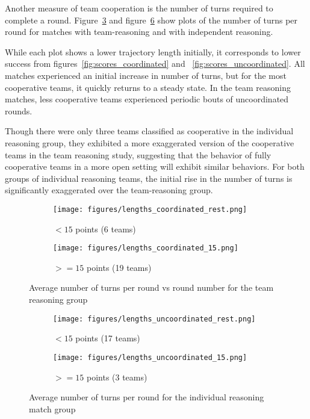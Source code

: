 {Another measure of team cooperation is the number of turns required to complete a round. Figure~\ref{fig:lengths_coordinated} and figure~\ref{fig:lengths_uncoordinated} show plots of the number of turns per round for matches with team-reasoning and with independent reasoning.

While each plot shows a lower trajectory length initially, it corresponds to lower success from figures~\ref{fig:scores_coordinated} and ~\ref{fig:scores_uncoordinated}. All matches experienced an initial increase in number of turns, but for the most cooperative teams, it quickly returns to a steady state. In the team reasoning matches, less cooperative teams experienced periodic bouts of uncoordinated rounds.

Though there were only three teams classified as cooperative in the individual reasoning group, they exhibited a more exaggerated version of the cooperative teams in the team reasoning study, suggesting that the behavior of fully cooperative teams in a more open setting will exhibit similar behaviors. For both groups of individual reasoning teams, the initial rise in the number of turns is significantly exaggerated over the team-reasoning group. 


\begin{figure}
\centering
\begin{subfigure}{.5\textwidth}
\centering
\texttt{[image: figures/lengths\_coordinated\_rest.png]}
\caption{$< 15$ points (6 teams)}
\label{fig:lengths_coordinated_rest}
\end{subfigure}%
\begin{subfigure}{.5\textwidth}
\centering
\texttt{[image: figures/lengths\_coordinated\_15.png]}
\caption{$>= 15$ points (19 teams)}
\label{fig:lengths_coordinated_15}
\end{subfigure}
\caption{Average number of turns per round vs round number for the team reasoning group}
\label{fig:lengths_coordinated}
\end{figure}

\begin{figure}
\centering
\begin{subfigure}{.5\textwidth}
\centering
\texttt{[image: figures/lengths\_uncoordinated\_rest.png]}
\caption{$< 15$ points (17 teams)}
\label{fig:lengths_uncoordinated_rest}
\end{subfigure}%
\begin{subfigure}{.5\textwidth}
\centering
\texttt{[image: figures/lengths\_uncoordinated\_15.png]}
\caption{$>= 15$ points (3 teams)}
\label{fig:lengths_uncoordinated_15}
\end{subfigure}
\caption{Average number of turns per round for the individual reasoning match group}
\label{fig:lengths_uncoordinated}
\end{figure}
}

